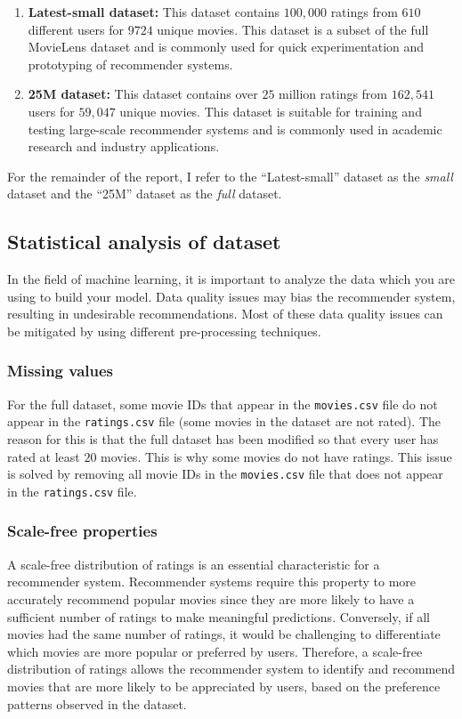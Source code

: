 \documentclass{article}
\begin{document}
\begin{enumerate}
\item \textbf{Latest-small dataset:} This dataset contains $100,000$ ratings from $610$ different users for $9724$ unique movies.
This dataset is a subset of the full MovieLens dataset and is commonly used for quick
experimentation and prototyping of recommender systems.

\item \textbf{25M dataset:} This dataset contains over $25$ million ratings from $162,541$ users for $59,047$ unique movies.
This dataset is suitable for training and testing large-scale recommender 
systems and is commonly used in academic research and industry applications.
\end{enumerate}

For the remainder of the report, I refer to the ``Latest-small'' dataset as the \emph{small} dataset and the
``25M'' dataset as the \emph{full} dataset.

\subsection{Statistical analysis of dataset}
In the field of machine learning, it is important to analyze the data which you are using to build your model. 
Data quality issues may bias the recommender system, resulting in undesirable recommendations.
Most of these data quality issues can be mitigated by using different pre-processing techniques.

\subsubsection{Missing values}
For the full dataset, some movie IDs that appear in the \texttt{movies.csv} file do not appear in the 
\texttt{ratings.csv} file (some movies in the dataset are not rated).
The reason for this is that the full dataset has been modified so that every user has rated at least $20$ movies.
This is why some movies do not have ratings. This issue is solved by removing all movie IDs in the
\texttt{movies.csv} file that does not appear in the \texttt{ratings.csv} file.

\subsubsection{Scale-free properties}
A scale-free distribution of ratings is an essential characteristic for a recommender system. Recommender systems 
require this property to more accurately recommend popular movies since they are more likely to have a sufficient 
number of ratings to make meaningful predictions. Conversely, if all movies had the same number of ratings, it 
would be challenging to differentiate which movies are more popular or preferred by users. 
Therefore, a scale-free distribution of ratings allows the recommender system to identify and recommend movies 
that are more likely to be appreciated by users, based on the preference patterns observed in the dataset.
\end{document}
